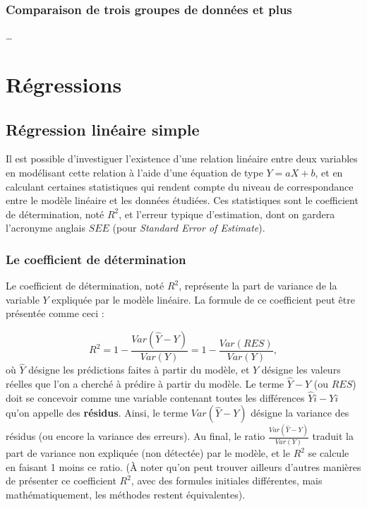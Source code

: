 \documentclass[
]{book}
\begin{document}
\hypertarget{comparaison-de-trois-groupes-de-donnuxe9es-et-plus}{%
\subsection{Comparaison de trois groupes de données et plus}\label{comparaison-de-trois-groupes-de-donnuxe9es-et-plus}}

\ldots{}

\hypertarget{ruxe9gressions}{%
\chapter{Régressions}\label{ruxe9gressions}}

\hypertarget{ruxe9gression-linuxe9aire-simple}{%
\section{Régression linéaire simple}\label{ruxe9gression-linuxe9aire-simple}}

Il est possible d'investiguer l'existence d'une relation linéaire entre deux variables en modélisant cette relation à l'aide d'une équation de type \(Y = aX + b\), et en calculant certaines statistiques qui rendent compte du niveau de correspondance entre le modèle linéaire et les données étudiées. Ces statistiques sont le coefficient de détermination, noté \(R^2\), et l'erreur typique d'estimation, dont on gardera l'acronyme anglais \(SEE\) (pour \emph{Standard Error of Estimate}).

\hypertarget{le-coefficient-de-duxe9termination}{%
\subsection{Le coefficient de détermination}\label{le-coefficient-de-duxe9termination}}

Le coefficient de détermination, noté \(R^2\), représente la part de variance de la variable \(Y\) expliquée par le modèle linéaire. La formule de ce coefficient peut être présentée comme ceci :

\[R^2 = 1 - {\frac {Var(\hat{Y} - Y) } {Var(Y)}} = 1 - {\frac {Var(RES)} {Var(Y)}}, \]
où \(\hat{Y}\) désigne les prédictions faites à partir du modèle, et \(Y\) désigne les valeurs réelles que l'on a cherché à prédire à partir du modèle. Le terme \(\hat{Y} - Y\) (ou \(RES\)) doit se concevoir comme une variable contenant toutes les différences \(\hat{Y}{i} - Y{i}\) qu'on appelle des \textbf{résidus}. Ainsi, le terme \({Var(\hat{Y} - Y) }\) désigne la variance des résidus (ou encore la variance des erreurs). Au final, le ratio \({\frac {Var(\hat{Y} - Y) } {Var(Y)}}\) traduit la part de variance non expliquée (non détectée) par le modèle, et le \(R^2\) se calcule en faisant 1 moins ce ratio. (À noter qu'on peut trouver ailleurs d'autres manières de présenter ce coefficient \(R^2\), avec des formules initiales différentes, mais mathématiquement, les méthodes restent équivalentes).
\end{document}

